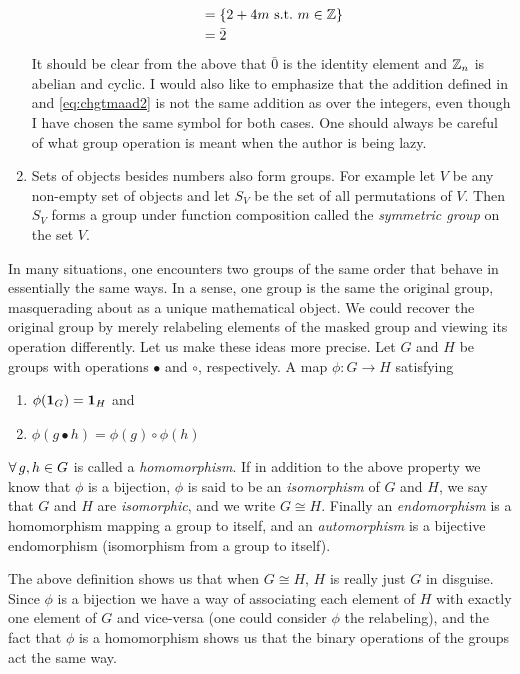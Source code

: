 \begin{example*}{}{}
\begin{enumerate}
\begin{equation}
\begin{aligned}
                         &=\{2+4m~\text{s.t.}~ m\in \mathbb{Z}\}\\
                         &=\bar{2}
          \end{aligned}
        \end{equation}
        It should be clear from the above that $\bar{0}$ is the identity
        element and $\mathbb{Z}_n$ is abelian and cyclic. I would
        also like to emphasize that the addition defined in 
         and \eqref{eq:chgtmaad2} is not the same
        addition as over the integers, even though I have chosen the same
        symbol for both cases. One should always be careful of what group
        operation is meant when the author is being lazy. 
  \item Sets of objects besides numbers also form groups. For example let $V$ 
        be any non-empty set of objects and let $S_{V}$ be the set of all
        permutations of $V$. Then $S_{V}$ forms a group under function
        composition called the {\it symmetric group} 
        on the set $V$.
\end{enumerate}
\end{example*}

In many situations, one encounters two groups of the same order that behave in
essentially the same ways. In a sense, one group is the same the original group,
masquerading about as a unique mathematical object. We could recover the
original group by merely relabeling elements of the masked group and viewing
its operation differently. Let us make these ideas more precise.
Let $G$ and $H$ be groups with operations $\bullet$ and
$\circ$, respectively. A map $\phi : G\to H$ satisfying
\begin{enumerate}
  \item $\phi({\mathbf 1}_G)={\mathbf 1}_H$ and
  \item $\phi(g \bullet h)=\phi(g)\circ\phi(h)$
\end{enumerate}
$\operatorname{\forall} g,h\in G$ is called a {\it homomorphism}. 
If in addition to the above property we know that $\phi$ is a bijection, 
$\phi$ is said to be an {\it isomorphism} of $G$ and 
$H$, we say that $G$ and $H$ are {\it isomorphic}, and we write $G\cong H$. 
Finally an {\it endomorphism} is a homomorphism 
mapping a group to itself, and an {\it automorphism}
is a bijective endomorphism (isomorphism from a group to itself).

The above definition shows us that when $G\cong H$, $H$ is really just $G$ in
disguise. Since $\phi$ is a bijection we have a way of associating each element
of $H$ with exactly one element of $G$ and vice-versa (one could consider 
$\phi$ the relabeling), and the fact that $\phi$ is a homomorphism shows us
that the binary operations of the groups act the same way.

